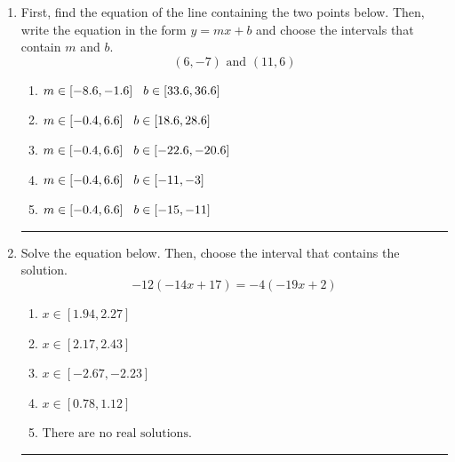 \documentclass[14pt]{extbook}
\newcommand{\litem}[1]{\item#1\hspace*{-1cm}\rule{\textwidth}{0.4pt}}
\begin{document}
\begin{enumerate}
{\begin{enumerate}[label=\Alph*.]
\end{enumerate} }
\litem{
First, find the equation of the line containing the two points below. Then, write the equation in the form $ y=mx+b $ and choose the intervals that contain $m$ and $b$.\[ (6, -7) \text{ and } (11, 6) \]\begin{enumerate}[label=\Alph*.]
\item \( m \in [-8.6, -1.6] \hspace*{3mm} b \in [33.6, 36.6] \)
\item \( m \in [-0.4, 6.6] \hspace*{3mm} b \in [18.6, 28.6] \)
\item \( m \in [-0.4, 6.6] \hspace*{3mm} b \in [-22.6, -20.6] \)
\item \( m \in [-0.4, 6.6] \hspace*{3mm} b \in [-11, -3] \)
\item \( m \in [-0.4, 6.6] \hspace*{3mm} b \in [-15, -11] \)

\end{enumerate} }
\litem{
Solve the equation below. Then, choose the interval that contains the solution.\[ -12(-14x + 17) = -4(-19x + 2) \]\begin{enumerate}[label=\Alph*.]
\item \( x \in [1.94, 2.27] \)
\item \( x \in [2.17, 2.43] \)
\item \( x \in [-2.67, -2.23] \)
\item \( x \in [0.78, 1.12] \)
\item \( \text{There are no real solutions.} \)


\end{enumerate}}
\end{enumerate}
\end{document}
